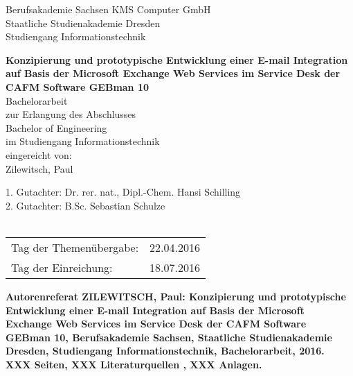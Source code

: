 \documentclass[fontsize=12pt]{scrartcl}
\begin{document}
\thispagestyle{empty}
\large
	\noindent Berufsakademie Sachsen \hfill KMS Computer GmbH\\
	Staatliche Studienakademie Dresden \\
	Studiengang Informationstechnik
\begin{center}	
	\vspace*{4cm}
	\textbf{Konzipierung und prototypische Entwicklung einer E-mail Integration auf Basis der Microsoft Exchange Web Services im Service Desk der CAFM Software GEBman 10}\\
	\vspace*{2cm}
		Bachelorarbeit\\ zur Erlangung des Abschlusses\\ Bachelor of Engineering\\ im Studiengang 						Informationstechnik\\
	\vspace*{2cm}
	eingereicht von:\\Zilewitsch, Paul
	\vspace*{3cm}
\end{center}
	1. Gutachter: Dr. rer. nat., Dipl.-Chem. Hansi Schilling\\
	2. Gutachter: B.Sc. Sebastian Schulze 
	\\\\
	\begin{tabular}{@{}ll}
		Tag der Themenübergabe:&22.04.2016\\
		Tag der Einreichung:&18.07.2016
	\end{tabular}
\pagebreak





\noindent
\Large\bfseries
Autorenreferat
\normalsize\mdseries
\thispagestyle{empty}
\newline\newline
\noindent
ZILEWITSCH, Paul: Konzipierung und prototypische Entwicklung einer E-mail Integration auf Basis der Microsoft Exchange Web Services im Service Desk der CAFM Software GEBman 10,  Berufsakademie Sachsen, Staatliche Studienakademie Dresden, Studiengang Informationstechnik, Bachelorarbeit, 2016.\\ 
XXX Seiten, XXX Literaturquellen , XXX Anlagen. 
\newpage
\end{document}

